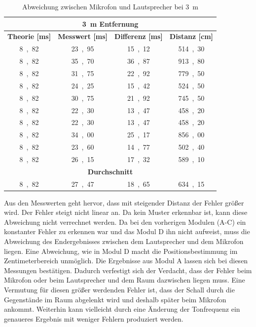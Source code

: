 \begin{table}[H]
\centering
\caption{Abweichung zwischen Mikrofon und Lautsprecher bei \SI{3}{m}}
\label{tab:modul_D_3}
\begin{tabular}{|c|c|c|c|}
\hline
\multicolumn{4}{|c|}{\textbf{\SI{3}{\m} Entfernung}} \\ \hline
\textbf{Theorie [\si{ms}]} & \textbf{Messwert [\si{ms}]} & \multicolumn{1}{l|}{\textbf{Differenz [\si{ms}]}} & \multicolumn{1}{l|}{\textbf{Distanz [\si{cm}]}} \\ \hline
\si{8,82} & \si{23,95} & \si{15,12} & \si{514,30} \\ \hline
\si{8,82} & \si{35,70} & \si{36,87} & \si{913,80} \\ \hline
\si{8,82} & \si{31,75} & \si{22,92} & \si{779,50} \\ \hline
\si{8,82} & \si{24,25} & \si{15,42} & \si{524,50} \\ \hline
\si{8,82} & \si{30,75} & \si{21,92} & \si{745,50} \\ \hline
\si{8,82} & \si{22,30} & \si{13,47} & \si{458,20} \\ \hline
\si{8,82} & \si{22,30} & \si{13,47} & \si{458,20} \\ \hline
\si{8,82} & \si{34,00} & \si{25,17} & \si{856,00} \\ \hline
\si{8,82} & \si{23,60} & \si{14,77} & \si{502,40} \\ \hline
\si{8,82} & \si{26,15} & \si{17,32} & \si{589,10} \\ \hline
\multicolumn{4}{|c|}{\textbf{Durchschnitt}} \\ \hline
\si{8,82} & \si{27,47} & \si{18,65} & \si{634,15} \\ \hline
\end{tabular}
\end{table}

Aus den Messwerten geht hervor, dass mit steigender Distanz der Fehler größer wird. Der Fehler steigt nicht linear an. Da kein Muster erkennbar ist, kann diese Abweichung nicht verrechnet werden. Da bei den vorherigen Modulen (A-C) ein konstanter Fehler zu erkennen war und das Modul D ihn nicht aufweist, muss die Abweichung des Endergebnisses zwischen dem Lautsprecher und dem Mikrofon liegen. Eine Abweichung, wie in Modul D macht die Positionsbestimmung im Zentimeterbereich unmöglich. Die Ergebnisse aus Modul A lassen sich bei diesen Messungen bestätigen. Dadurch verfestigt sich der Verdacht, dass der Fehler beim Mikrofon oder beim Lautsprecher und dem Raum dazwischen liegen muss. Eine Vermutung für diesen größer werdenden Fehler ist, dass der Schall durch die Gegenstände im Raum abgelenkt wird und deshalb später beim Mikrofon ankommt. Weiterhin kann vielleicht durch eine Änderung der Tonfrequenz ein genaueres Ergebnis mit weniger Fehlern produziert werden.

